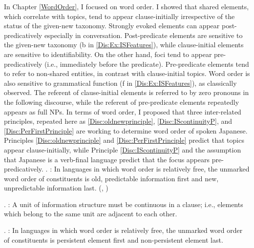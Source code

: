 In Chapter \ref{WordOrder},
I focused on word order.
I showed that shared elements, which correlate with topics, tend to appear clause-initially irrespective of the status of the given-new taxonomy.
Strongly evoked elements can appear post-predicatively
especially in conversation.
Post-predicate elements are sensitive to the given-new taxonomy (b in \ref{Dis:Ex:ISFeatures}),
while clause-initial elements are sensitive to identifiability.
On the other hand, foci tend to appear pre-predicatively
(i.e., immediately before the predicate).
Pre-predicate elements tend to refer to non-shared entities,
in contrast with clause-initial topics.
Word order is also sensitive to grammatical function (f in \ref{Dis:Ex:ISFeatures}),
as classically observed.
The referent of clause-initial elements is referred to by zero pronouns in the following discourse,
while the referent of pre-predicate elements repeatedly appears as full NPs.
In terms of word order,
I proposed that three inter-related principles, repeated here as \ref{Disc:oldnewprinciple}, \ref{Disc:IScontinuityP}, and \ref{Disc:PerFirstPrinciple} are working to determine word order of spoken Japanese.
Principles \ref{Disc:oldnewprinciple} and \ref{Disc:PerFirstPrinciple}
predict that topics appear clause-initially,
while Principle \ref{Disc:IScontinuityP} and the assumption that Japanese is a verb-final language predict that
the focus appears pre-predicatively.
%
\ex. \label{Disc:oldnewprinciple}:
 In languages in which word order is relatively free,
 the unmarked word order of constituents is old,
 predictable information first and new, unpredictable information last.
 \hfill{(, )}

\ex. \label{Disc:IScontinuityP}:
 A unit of information structure must be continuous in a clause;
 i.e., elements which belong to the same unit are adjacent to each other.

\ex. \label{Disc:PerFirstPrinciple}:
 In languages in which word order is relatively free,
 the unmarked word order of constituents is persistent element first and non-persistent element last.

